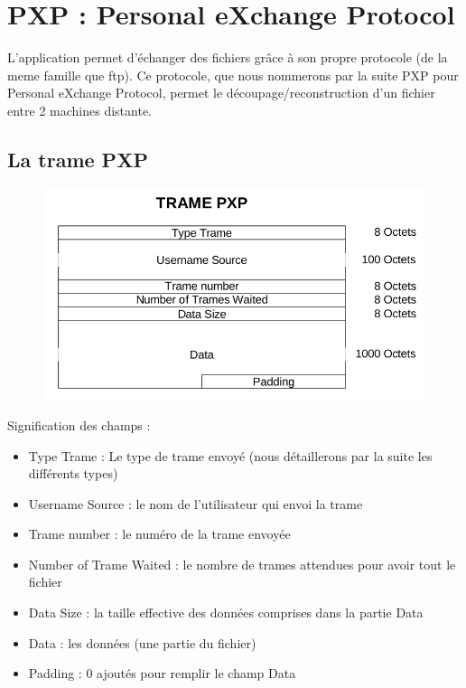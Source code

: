 \documentclass[a4paper, 11pt, french]{report}
\begin{document}
	\section{PXP : Personal eXchange Protocol} %
		L'application permet d'échanger des fichiers grâce à son propre protocole (de la meme famille que ftp). 
		Ce protocole, que nous nommerons par la suite PXP pour Personal eXchange Protocol, permet le découpage/reconstruction d'un fichier entre 2 machines distante.
	
		\subsection{La trame PXP}
			\begin{figure}[!h]
				\centering
				\includegraphics[scale=0.5]{TramePXP.png}
				\label{Trame PXP}
			\end{figure}
			Signification des champs :
			\begin{itemize}
				\item Type Trame : Le type de trame envoyé (nous détaillerons par la suite les différents types)
				\item Username Source : le nom de l'utilisateur qui envoi la trame
				\item Trame number : le numéro de la trame envoyée
				\item Number of Trame Waited : le nombre de trames attendues pour avoir tout le fichier
				\item Data Size : la taille effective des données comprises dans la partie Data
				\item Data : les données (une partie du fichier)
				\item Padding : 0 ajoutés pour remplir le champ Data
			\end{itemize}
			
\end{document}
